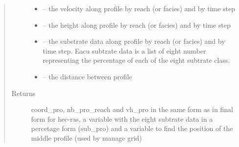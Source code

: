 \documentclass[letterpaper,10pt,english]{sphinxmanual}
\begin{document}
\begin{fulllineitems}
\begin{quote}
\begin{description}
\begin{itemize}
\item {} 
 -- the velocity along profile by reach (or facies) and by time step

\item {} 
 -- the height along profile by reach (or facies) and by time step

\item {} 
 -- the substrate data along profile by reach (or facies) and by time step. Eacu subtrate data is a list
of eight number representing the percentage of each of the eight subtrate class.

\item {} 
 -- the distance between profile

\end{itemize}

\item[{Returns}] \leavevmode
coord\_pro, nb\_pro\_reach and vh\_pro in the same form as in final form for hec-ras, a variable with the eight
subtrate data in a percetage form (sub\_pro) and a variable to find the position of the middle profile
(used by manage grid)

\end{description}\end{quote}

\end{fulllineitems}

\end{document}
